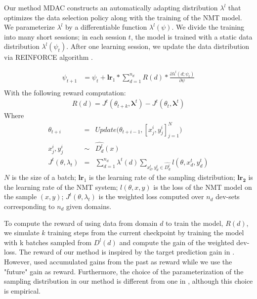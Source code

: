\documentclass[11pt]{article}
\newcommand{\vlambda}{\ensuremath{\boldsymbol\lambda}\xspace} %
\begin{document}
Our method MDAC constructs an automatically adapting distribution $\lambda^{l}$ that optimizes the data selection policy along with the training of the NMT model. We parameterize $\lambda^{l}$ by a differentiable function $\lambda^l(\psi)$. We divide the training into many short sessions; in each session $t$, the model is trained with a static data distribution $\lambda^{l}(\psi_t)$. After one learning session, we update the data distribution via REINFORCE algorithm \citep{Williams92simple}.

\begin{align*}
\psi_{t+1} &= \psi_t + \mathbf{lr}_{1} * \displaystyle{\mathop{\sum}_{d=1}^{n_d}} R(d) * \frac{\partial \lambda^l(d;\psi_t)}{\partial \psi} \\
\end{align*}
\begingroup
\allowdisplaybreaks
With the following reward computation:
\begin{align*}
  R(d) = J^t(\theta_{t+k},\vlambda^t) - J^t(\theta_t,\vlambda^t)
\end{align*}
Where 
\begin{equation}
\begin{array}{rcl}
\theta_{t+i} &=& Update\big(\theta_{t+i-1},[x^i_j,y^i_j]_{j=1}^N\big) \\ \nonumber
x^i_j, y^i_j &\sim& \widehat{D^l_d}(x) \\
J^t(\theta,\lambda_t) &=& \displaystyle{\mathop{\sum}_{d=1}^{n_d}}\lambda^t(d)\displaystyle{\mathop{\sum}_{x^t_d,y^t_d \in \widehat{D^t_d}}} l(\theta,x^t_d,y^t_d)
\end{array}
\end{equation}
\endgroup
$N$ is the size of a batch; $\mathbf{lr}_{1}$ is the learning rate of the sampling distribution; $\mathbf{lr_2}$ is the learning rate of the NMT system; $l(\theta,x,y)$ is the loss of the NMT model on the sample $(x,y)$; $J^t(\theta,\lambda_t)$ is the weighted loss computed over $n_d$ dev-sets corresponding to $n_d$ given domains.

To compute the reward of using data from domain $d$ to train the model, $R(d)$, we simulate $k$ training steps from the current checkpoint by training the model with k batches sampled from $D^l(d)$ and compute the gain of the weighted dev-loss. The reward of our method is inspired by the target prediction gain in \cite{Graves17automated}. However, \cite{Graves17automated} used accumulated gains from the past as reward while we use the "future" gain as reward. Furthermore, the choice of the parameterization of the sampling distribution in our method is different from one in \cite{Graves17automated}, although this choice is empirical.
\end{document}
